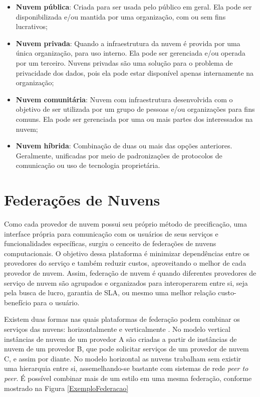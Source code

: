 \begin{itemize}
	\item \textbf{Nuvem pública}: Criada para ser usada pelo público em geral. Ela pode ser disponibilizada e/ou mantida por uma organização, com ou sem fins lucrativos;
	\item \textbf{Nuvem privada}: Quando a infraestrutura da nuvem é provida por uma única organização, para uso interno. Ela pode ser gerenciada e/ou operada por um terceiro. Nuvens privadas são uma solução para o problema de privacidade dos dados, pois ela pode estar disponível apenas internamente na organização;
	\item \textbf{Nuvem comunitária}: Nuvem com infraestrutura desenvolvida com o objetivo de ser utilizada por um grupo de pessoas e/ou organizações para fins comuns. Ela pode ser gerenciada por uma ou mais partes dos interessados na nuvem;
	\item \textbf{Nuvem híbrida}: Combinação de duas ou mais das opções anteriores. Geralmente, unificadas por meio de padronizações de protocolos de comunicação ou uso de tecnologia proprietária.
\end{itemize}

\section{Federações de Nuvens}

Como cada provedor de nuvem possui seu próprio método de precificação, uma interface própria para comunicação com os usuários de seus serviços e funcionalidades específicas, surgiu o cenceito de federações de nuvens computacionais. O objetivo dessa plataforma é minimizar dependências entre os provedores do serviço e também reduzir custos, aproveitando o melhor de cada provedor de nuvem. Assim, federação de nuvem é quando diferentes provedores de serviço de nuvem são agrupados e organizados para interoperarem entre si, seja pela busca de lucro, garantia de \acrshort{SLA}, ou mesmo uma melhor relação custo-benefício para o usuário.

Existem duas formas nas quais plataformas de federação podem combinar os serviços das nuvens: horizontalmente e verticalmente \cite{5557976}\cite{7835207}. No modelo vertical instâncias de nuvem de um provedor A são criadas a partir de instâncias de nuvem de um provedor B, que pode solicitar serviços de um provedor de nuvem C, e assim por diante. No modelo horizontal as nuvens trabalham sem existir uma hierarquia entre si, assemelhando-se bastante com sistemas de rede \textit{peer to peer}. É possível combinar mais de um estilo em uma mesma federação, conforme mostrado na Figura \ref{ExemploFederacao}

